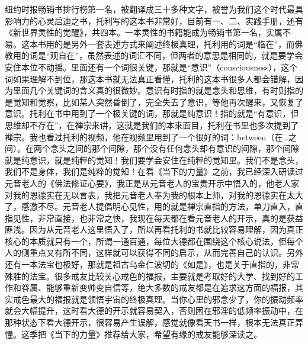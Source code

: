 \begin{book}[《当下的力量》]
    纽约时报畅销书排行榜第一名，被翻译成三十多种文字，被誉为我们这个时代最具影响力的心灵启迪之书，托利写的这本书非常好，目前有一、二、实践手册，还有《新世界灵性的觉醒》，共四本。一本灵性的书籍能成为畅销书第一名，实属不易。这本书用的是另外一套表述方式来阐述终极真理，托利用的词是“临在”，而佛教用的词是“观自在”，虽然表述的词汇不同，但两者的意思是相同的，就是要学会安住本位不动摇。里面还有一个词很关键，那就是“意识”（consciousness），这个词如果理解不到位，那这本书就无法真正看懂，托利的这本书很多人都会错解，因为里面几个关键词的含义真的很微妙。意识有时指的就是念头和思维，有时则指的是觉知和觉察，比如某人突然昏倒了，完全失去了意识，等他再次醒来，又恢复了意识。托利在书中用到了一个极关键的词，那就是纯意识！指的就是“有意识，但思维却不存在”，在禅宗来讲，这就是我们的本来面目，托利在书里也多次提到了禅宗。我也看过托利的视频，他在视频里用到了一个很好的词：between（在…之间）。在两个念头之间的那个间隙，那个没有任何念头却有意识的间隙，那个间隙就是纯意识，就是纯粹的觉知！我们要学会安住在纯粹的觉知里。我们不是念头，我们不是身体，我们是纯粹的觉知！在看《当下的力量》之前，我已经深入研读过元音老人的《佛法修证心要》，我正是从元音老人的宝贵开示中悟入的，他老人家对我的恩德实在无以言表，我把元音老人奉为我的根本上师，对我的恩德实在太大了，感激不尽。元音老人提倡明心见性，用的就是禅宗直指的方法，单刀直入，直指见性，非常直接，也非常之快，我现在每天都在看元音老人的开示，真的是获益匪浅。因为从元音老人这里悟入了，所以再看托利的书就比较容易理解，因为真正核心的本质就只有一个，所谓一通百通，每位大德都在围绕这个核心说法，但每个人的侧重点又有所不同，这样就可以获得不同的启示，从而完善自己的认识。另外还有一本法宝也极好，那就是祖古乌金仁波切的《如是》，也是关于直指的，非常殊胜的法宝。很多戒友比较关心戒色的福报，主要就是考取好的大学、找到好的工作和眷属、能够重新变帅变自信等，绝大多数的戒友都是在追求这方面的福报，其实戒色最大的福报就是领悟宇宙的终极真理。当你心里的邪念少了，你的振动频率就会大幅提升，这时看大德的开示就容易契入，否则困在邪淫的低频率振动中，在那种状态下看大德开示，很容易产生误解，感觉就像看天书一样，根本无法真正弄懂。这季把《当下的力量》推荐给大家，希望有缘的戒友能够深读之。
\end{book}
